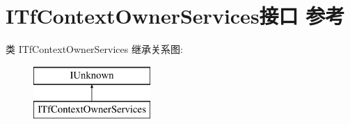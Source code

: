 \hypertarget{interface_i_tf_context_owner_services}{}\section{I\+Tf\+Context\+Owner\+Services接口 参考}
\label{interface_i_tf_context_owner_services}
类 I\+Tf\+Context\+Owner\+Services 继承关系图\+:\begin{figure}[H]
\begin{center}
\leavevmode
\includegraphics[height=2.000000cm]{interface_i_tf_context_owner_services}
\end{center}
\end{figure}
